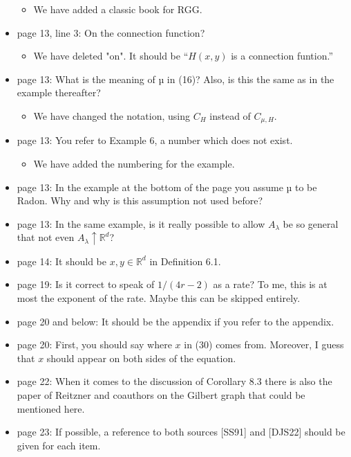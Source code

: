 \documentclass[11pt]{article}
\def\real{{\mathord{{\rm I\kern-2.8pt R}}}}        %
\def\real{{\mathord{\mathbb R}}}
\begin{document}
\begin{itemize}
  \begin{itemize}
    \item We have added a classic book for RGG.
  \end{itemize}
  \item  page 13, line 3: On the connection function?
  \begin{itemize}
    \item We have deleted "on". It should be ``$H(x,y)$ is a connection funtion.'' 
  \end{itemize}
  \item  page 13: What is the meaning of µ in (16)? Also, is this the same as in the example thereafter?
  \begin{itemize}
    \item We have changed the notation, using $C_H$ instead of $C_{\mu, H}$.
  \end{itemize}
  \item  page 13: You refer to Example 6, a number which does not exist.
  \begin{itemize}
    \item We have added the numbering for the example.
  \end{itemize}
  \item  page 13: In the example at the bottom of the page you assume µ to be Radon. Why and why is this assumption not used before?
  \item  page 13: In the same example, is it really possible to allow
    $A_\lambda$ be so general that not even $A_\lambda \uparrow \real^d$?
  \item  page 14: It should be $x, y \in \real^d$ in Definition 6.1.
  \item  page 19: Is it correct to speak of $1/(4r - 2)$ as a rate? To me, this is at most the exponent of the rate. Maybe this can be skipped entirely.
  \item  page 20 and below: It should be the appendix if you refer to the appendix.
  \item  page 20: First, you should say where $x$ in (30) comes from. Moreover, I guess that $x$ should appear on both sides of the equation.
  \item  page 22: When it comes to the discussion of Corollary 8.3 there is also the paper of Reitzner and coauthors on the Gilbert graph that could be mentioned here.
  \item  page 23: If possible, a reference to both sources [SS91] and [DJS22] should be given for each item.
\end{itemize}
\end{document}
